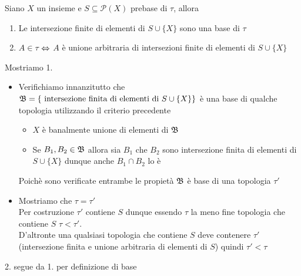 \spazio
\begin{prop}Siano $X$ un  insieme e $S\subseteq \mathcal{P}(X)$ prebase di $\tau$, allora
\begin{enumerate}
 \item Le intersezione finite di elementi di $S \cup \{ X\} $ sono una base di $\tau$
 \item $A\in \tau $ $ \Leftrightarrow $ $ A$ \`e unione arbitraria di intersezioni finite di elementi di $S \cup \{ X \} $
\end{enumerate}
\proof Mostriamo 1.
\begin{itemize}
\item Verifichiamo innanzitutto che $\mathfrak{B}=\{ \text{ intersezione finita di elementi di } S\cup \{ X \} \}$ \`e una base di qualche topologia utilizzando il criterio precedente
\begin{itemize}
 \item $X$ \`e banalmente unione di elementi di $\mathfrak{B}$ 
 \item Se $B_1,B_2\in \mathfrak{B}$ allora sia $B_1$ che $B_2$ sono intersezione finita di elementi di $S \cup \{ X\} $ dunque anche $B_1\cap B_2$ lo \`e 
\end{itemize}
Poich\`e sono verificate entrambe le propiet\`a $\mathfrak{B}$ \`e base di una topologia $\tau'$
\item Mostriamo che $\tau=\tau'$\\
Per costruzione $\tau'$ contiene $S$ dunque essendo $\tau$ la meno fine topologia che contiene $S$ $ \tau< \tau' $.\\
D'altronte una qualsiasi topologia che contiene $S$ deve contenere $\tau'$ (intersezione finita e unione arbitraria di elementi di $S$) quindi $\tau'< \tau $ 
\end{itemize}
2. segue da 1. per definizione di base
\endproof
\end{prop}

